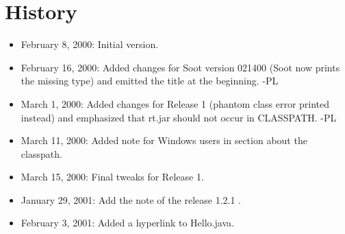 \documentclass{article}
\begin{document}
\section{History}
\begin{itemize}
\item February 8, 2000: Initial version.

\item February 16, 2000: Added changes for Soot version 021400 (Soot now prints
the missing type) and emitted the title at the beginning. -PL

\item March 1, 2000: Added changes for Release 1 (phantom class error
printed instead) and emphasized that rt.jar should not occur in CLASSPATH. -PL

\item March 11, 2000: Added note for Windows users in section about the
classpath.

\item March 15, 2000: Final tweaks for Release 1.

\item January 29, 2001: Add the note of the release 1.2.1 .

\item February 3, 2001: Added a hyperlink to Hello.java.
\end{itemize}
\end{document}
